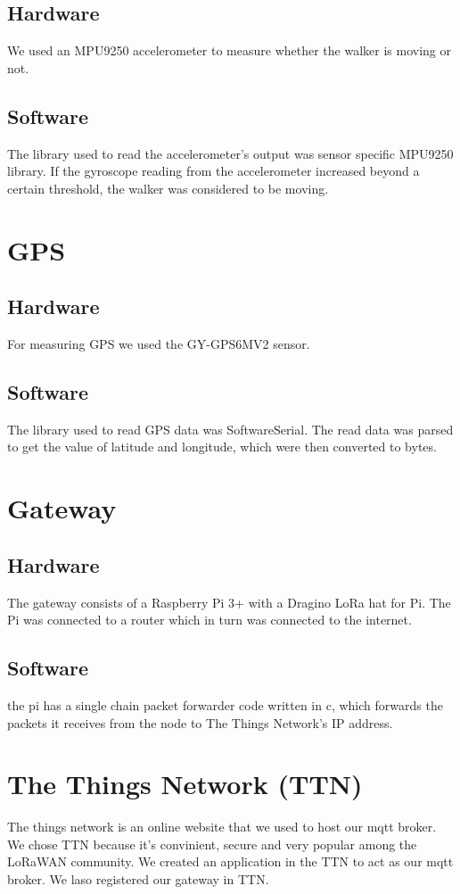 	\subsection{Hardware}
	We used an MPU9250 accelerometer to measure whether the walker is moving or not.

	\subsection{Software}
	The library used to read the accelerometer's output was sensor specific MPU9250 library. If the gyroscope reading from the accelerometer increased beyond a certain threshold, the walker was considered to be moving.

\section{GPS}

	\subsection{Hardware}
	For measuring GPS we used the GY-GPS6MV2 sensor.

	\subsection{Software}
	The library used to read GPS data was SoftwareSerial. The read data was parsed to get the value of latitude and longitude, which were then converted to bytes.

\section{Gateway}
		
	\subsection{Hardware}
	The gateway consists of a Raspberry Pi 3+ with a Dragino LoRa hat for Pi. The Pi was connected to a router which in turn was connected to the internet.


	\subsection{Software}
	the pi has a single chain packet forwarder code written in c, which forwards the packets it receives from the node to The Things Network's IP address. 

\section{The Things Network (TTN)}
	The things network is an online website that we used to host our mqtt broker. We chose TTN because it's convinient, secure and very popular among the LoRaWAN community. We created an application in the TTN to act as our mqtt broker. We laso registered our gateway in TTN.

